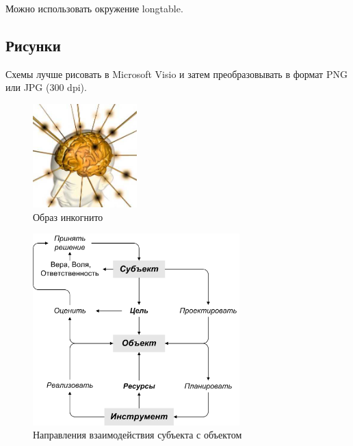 \documentclass[utf8]{../IncArticle}
\begin{document}
Можно использовать окружение {\sf longtable}.

\subsection{Рисунки}
Схемы лучше рисовать в Microsoft Visio и затем преобразовывать в формат PNG или JPG (300 dpi).

\begin{figure}[h]
\begin{center}\small
\includegraphics [height=40mm]{pics/mindpowerneg.jpg}%
\caption{Образ инкогнито\label{fig1}}
\end{center}
\end{figure}

\begin{figure}[ht]
\begin{center}\small
\includegraphics [width=80mm]{pics/mshapb.png}
\caption{Направления взаимодействия субъекта с объектом\label{fig2}}
\end{center}
\end{figure}
\end{document}
